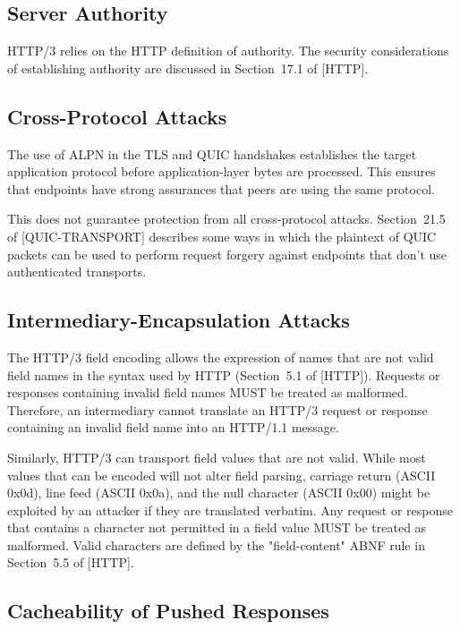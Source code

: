 \documentclass{article}
\begin{document}
\subsection{Server Authority}

HTTP/3 relies on the HTTP definition of authority.  The security considerations of establishing authority are discussed in Section~17.1 of [HTTP].

\subsection{Cross-Protocol Attacks}

The use of ALPN in the TLS and QUIC handshakes establishes the target application protocol before application-layer bytes are processed. This ensures that endpoints have strong assurances that peers are using the same protocol.

This does not guarantee protection from all cross-protocol attacks. Section~21.5 of [QUIC-TRANSPORT] describes some ways in which the plaintext of QUIC packets can be used to perform request forgery against endpoints that don't use authenticated transports.

\subsection{Intermediary-Encapsulation Attacks}

The HTTP/3 field encoding allows the expression of names that are not valid field names in the syntax used by HTTP (Section~5.1 of [HTTP]). Requests or responses containing invalid field names MUST be treated as malformed.  Therefore, an intermediary cannot translate an HTTP/3 request or response containing an invalid field name into an HTTP/1.1 message.

Similarly, HTTP/3 can transport field values that are not valid. While most values that can be encoded will not alter field parsing, carriage return (ASCII 0x0d), line feed (ASCII 0x0a), and the null character (ASCII 0x00) might be exploited by an attacker if they are translated verbatim.  Any request or response that contains a character not permitted in a field value MUST be treated as malformed.  Valid characters are defined by the "field-content" ABNF rule in Section~5.5 of [HTTP].

\subsection{Cacheability of Pushed Responses}
\end{document}
